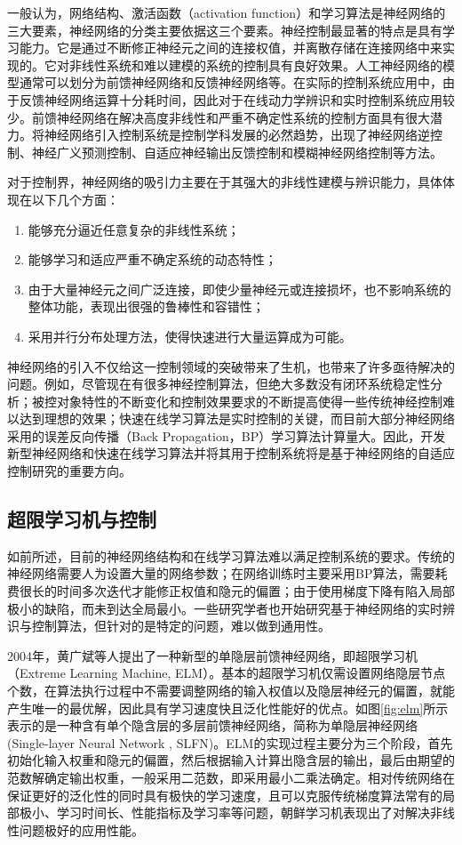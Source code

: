 一般认为，网络结构、激活函数（activation function）和学习算法是神经网络的三大要素，神经网络的分类主要依据这三个要素。神经控制最显著的特点是具有学习能力。它是通过不断修正神经元之间的连接权值，并离散存储在连接网络中来实现的。它对非线性系统和难以建模的系统的控制具有良好效果。人工神经网络的模型通常可以划分为前馈神经网络和反馈神经网络等。在实际的控制系统应用中，由于反馈神经网络运算十分耗时间，因此对于在线动力学辨识和实时控制系统应用较少。前馈神经网络在解决高度非线性和严重不确定性系统的控制方面具有很大潜力。将神经网络引入控制系统是控制学科发展的必然趋势，出现了神经网络逆控制、神经广义预测控制、自适应神经输出反馈控制和模糊神经网络控制等方法。

对于控制界，神经网络的吸引力主要在于其强大的非线性建模与辨识能力，具体体现在以下几个方面：
\begin{enumerate}
\item 能够充分逼近任意复杂的非线性系统；
\item 能够学习和适应严重不确定系统的动态特性；
\item 由于大量神经元之间广泛连接，即使少量神经元或连接损坏，也不影响系统的整体功能，表现出很强的鲁棒性和容错性；
\item 采用并行分布处理方法，使得快速进行大量运算成为可能。
\end{enumerate}

神经网络的引入不仅给这一控制领域的突破带来了生机，也带来了许多亟待解决的问题。例如，尽管现在有很多神经控制算法，但绝大多数没有闭环系统稳定性分析；被控对象特性的不断变化和控制效果要求的不断提高使得一些传统神经控制难以达到理想的效果；快速在线学习算法是实时控制的关键，而目前大部分神经网络采用的误差反向传播（Back Propagation，BP）学习算法计算量大。因此，开发新型神经网络和快速在线学习算法并将其用于控制系统将是基于神经网络的自适应控制研究的重要方向。

\subsection{超限学习机与控制}

如前所述，目前的神经网络结构和在线学习算法难以满足控制系统的要求。传统的神经网络需要人为设置大量的网络参数；在网络训练时主要采用BP算法，需要耗费很长的时间多次迭代才能修正权值和隐元的偏置；由于使用梯度下降有陷入局部极小的缺陷，而未到达全局最小。一些研究学者也开始研究基于神经网络的实时辨识与控制算法，但针对的是特定的问题，难以做到通用性。

2004年，黄广斌等人提出了一种新型的单隐层前馈神经网络，即超限学习机（Extreme Learning Machine, ELM）。基本的超限学习机仅需设置网络隐层节点个数，在算法执行过程中不需要调整网络的输入权值以及隐层神经元的偏置，就能产生唯一的最优解，因此具有学习速度快且泛化性能好的优点。如图\eqref{fig:elm}所示表示的是一种含有单个隐含层的多层前馈神经网络，简称为单隐层神经网络(Single-layer Neural Network , SLFN)。ELM的实现过程主要分为三个阶段，首先初始化输入权重和隐元的偏置，然后根据输入计算出隐含层的输出，最后由期望的范数解确定输出权重，一般采用二范数，即采用最小二乘法确定。相对传统网络在保证更好的泛化性的同时具有极快的学习速度，且可以克服传统梯度算法常有的局部极小、学习时间长、性能指标及学习率等问题，朝鲜学习机表现出了对解决非线性问题极好的应用性能。

